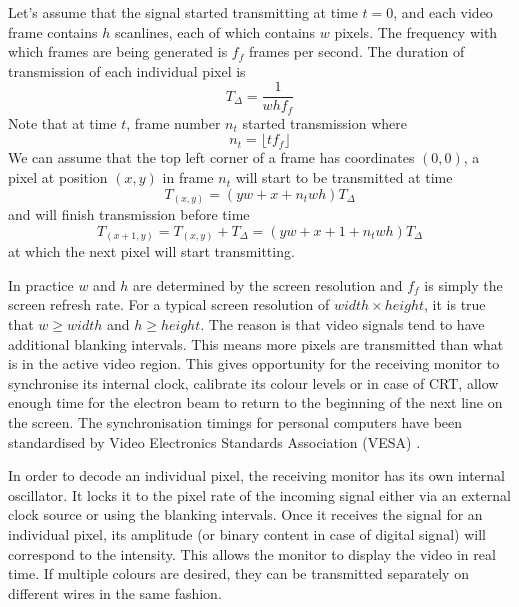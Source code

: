 \documentclass[a4paper,12pt,twoside,openright]{report}
\begin{document}
Let's assume that the signal started transmitting at time $t=0$, and each video frame contains $h$ scanlines, each of which contains $w$ pixels. The frequency with which frames are being generated is $f_{f}$ frames per second. The duration of transmission of each individual pixel is \begin{equation}
\label{eq:tdelta_definition}
T_{\Delta}=\frac{1}{w h f_{f}}
\end{equation}
Note that at time $t$, frame number $n_{t}$ started transmission where 
\begin{equation}
n_{t}=\lfloor t f_{f} \rfloor
\end{equation}
We can assume that the top left corner of a frame has coordinates $(0, 0)$, a pixel at position $(x, y)$ in frame $n_{t}$ will start to be transmitted at time
\begin{equation}
T_{(x,y)}= (y w + x + n_{t} w h) T_{\Delta}
\end{equation}
and will finish transmission before time 
\begin{equation}
T_{(x+1,y)} = T_{(x,y)} + T_{\Delta} =(y w + x + 1 + n_{t} w h) T_{\Delta}
\end{equation}
at which the next pixel will start transmitting.

In practice $w$ and $h$ are determined by the screen resolution and $f_{f}$ is simply the screen refresh rate. For a typical screen resolution of $width \times height$, it is true that $w \geq width$ and $h \geq height$. The reason is that video signals tend to have additional blanking intervals. This means more pixels are transmitted than what is in the active video region. This gives opportunity for the receiving monitor to synchronise its internal clock, calibrate its colour levels or in case of CRT, allow enough time for the electron beam to return to the beginning of the next line on the screen. The synchronisation timings for personal computers have been standardised by Video Electronics Standards Association (VESA) \cite{vesa}.

In order to decode an individual pixel, the receiving monitor has its own internal oscillator. It locks it to the pixel rate of the incoming signal either via an external clock source or using the blanking intervals. Once it receives the signal for an individual pixel, its amplitude (or binary content in case of digital signal) will correspond to the intensity. This allows the monitor to display the video in real time. If multiple colours are desired, they can be transmitted separately on different wires in the same fashion.
\end{document}
